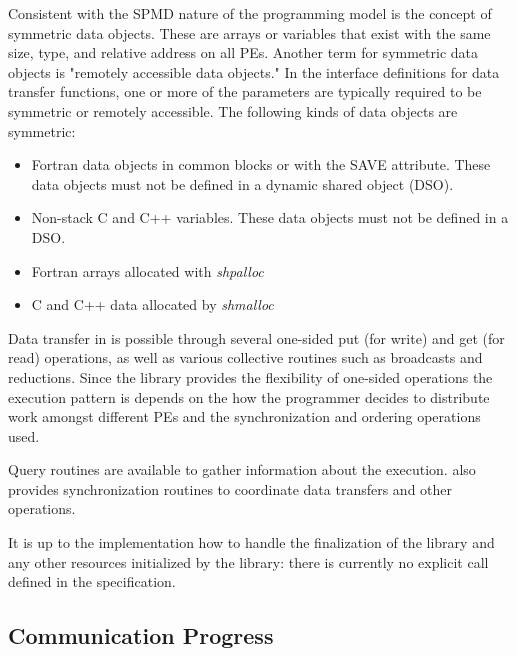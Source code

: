 Consistent with the SPMD nature of the \openshmem programming model  is  the concept of symmetric data objects.  These are arrays or variables that exist with the same size,  type,	 and  relative	address	 on  all  PEs. Another	term  for  symmetric data objects is "remotely accessible data objects."  In the interface definitions for \openshmem data  transfer	 functions,  one or more of the parameters are typically required to be symmetric or remotely accessible. The following kinds of data objects are symmetric:
\begin{itemize}
  \item Fortran data objects in common blocks or with the  SAVE  attribute. These data objects	must not be defined in a dynamic shared object (DSO).
  \item Non-stack C and C++ variables.   These  data	objects must  not  be defined in a DSO.
  \item Fortran arrays allocated with \textit{shpalloc} 
  \item C and C++ data allocated by \textit{shmalloc}
\end{itemize}       

Data transfer in \openshmem is possible through several one-sided put
(for write) and get (for read) operations, as well as various collective
routines such as broadcasts and reductions. Since the library provides the flexibility of one-sided operations the execution pattern is depends on the how the programmer decides to distribute work amongst different PEs and the synchronization and ordering operations used.

Query routines are available to gather information about the execution.
\openshmem also provides synchronization routines to coordinate data
transfers and other operations. 

It is up to the implementation how to handle the finalization of the
\openshmem library and any other resources initialized by the library:
there is currently no explicit call defined in the \openshmem specification.

\subsection{Communication Progress}

